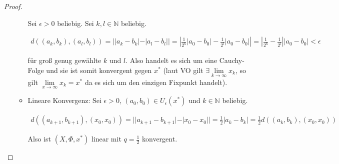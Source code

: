 \documentclass[]{article}
\begin{document}
\begin{proof}
\begin{enumerate}[label=\alph*)]
\begin{itemize}
			Sei $\epsilon > 0$ beliebig. Sei $k, l \in \mathbb{N}$ beliebig.
			
			\begin{align*}
				d((a_k, b_k), (a_l, b_l)) = ||a_k - b_k| - |a_l - b_l|| = \left|\frac{1}{2^{k}}|a_0 - b_0| - \frac{1}{2^{l}}|a_0 - b_0|\right| = \left|\frac{1}{2^{k}}-\frac{1}{2^{l}}\right||a_0 - b_0| < \epsilon
			\end{align*}
			
			für groß genug gewählte $k$ und $l$. Also handelt es sich um eine Cauchy-Folge und sie ist somit konvergent gegen $x^*$ (laut VO gilt $\exists \lim\limits_{k\rightarrow\infty}x_k$, so gilt $\lim\limits_{x\rightarrow\infty}x_k = x^*$ da es sich um den einzigen Fixpunkt handelt).
			
			\item Lineare Konvergenz: Sei $\epsilon >0$, $(a_0, b_0) \in U_\epsilon(x^*)$ und $k \in \mathbb{N}$ beliebig.
			
			\begin{align*}
				d((a_{k+1}, b_{k+1}), (x_0, x_0)) = ||a_{k+1} - b_{k+1}| - |x_0 - x_0|| = \frac{1}{2}|a_{k} - b_{k}| = \frac{1}{2} d((a_k, b_k), (x_0, x_0))
			\end{align*}
			
			Also ist $(X, \Phi, x^*)$ linear mit $q=\frac{1}{2}$ konvergent.
		\end{itemize}
		
	\end{enumerate}
	
\end{proof}

\newpage
\end{document}
